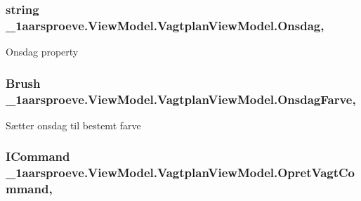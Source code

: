 \subsubsection[{Onsdag}]{\setlength{\rightskip}{0pt plus 5cm}string \+\_\+1aarsproeve.\+View\+Model.\+Vagtplan\+View\+Model.\+Onsdag\hspace{0.3cm}{\ttfamily [get]}, {\ttfamily [set]}}\label{class__1aarsproeve_1_1_view_model_1_1_vagtplan_view_model_a4d544dfd8109650066d5e9d25642c352}


Onsdag property 

\hypertarget{class__1aarsproeve_1_1_view_model_1_1_vagtplan_view_model_a3c463aaf64f3e35e910640a29969943d}{}
\subsubsection[{Onsdag\+Farve}]{\setlength{\rightskip}{0pt plus 5cm}Brush \+\_\+1aarsproeve.\+View\+Model.\+Vagtplan\+View\+Model.\+Onsdag\+Farve\hspace{0.3cm}{\ttfamily [get]}, {\ttfamily [set]}}\label{class__1aarsproeve_1_1_view_model_1_1_vagtplan_view_model_a3c463aaf64f3e35e910640a29969943d}


Sætter onsdag til bestemt farve 

\hypertarget{class__1aarsproeve_1_1_view_model_1_1_vagtplan_view_model_a76a5f40943fb46d05fdc59d4d786d206}{}
\subsubsection[{Opret\+Vagt\+Command}]{\setlength{\rightskip}{0pt plus 5cm}I\+Command \+\_\+1aarsproeve.\+View\+Model.\+Vagtplan\+View\+Model.\+Opret\+Vagt\+Command\hspace{0.3cm}{\ttfamily [get]}, {\ttfamily [set]}}\label{class__1aarsproeve_1_1_view_model_1_1_vagtplan_view_model_a76a5f40943fb46d05fdc59d4d786d206}



